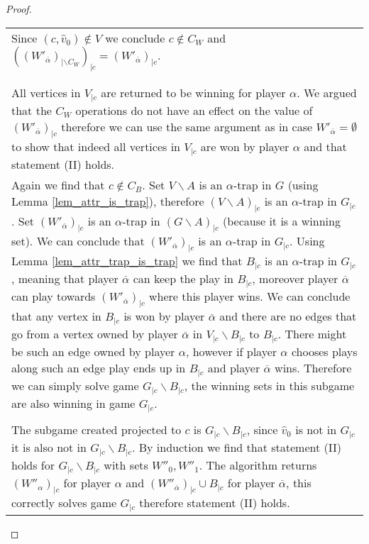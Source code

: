 \begin{theorem}
\begin{proof}
\begin{longtable}{|p{15.2cm}}
\begin{tabular}{|p{15cm}}
			\begin{tabular}{|p{14.8cm}}
				Case $W'_{\overline{\alpha}} \neq \emptyset$\\
				\hline
				Since $(c,\hat{v}_0) \notin V$ we conclude $c \notin C_W$ and $((W'_{\overline{\alpha}})_{|\backslash C_W})_{|c} = (W'_{\overline{\alpha}})_{|c}$.\\\\
				\begin{tabular}{|p{14.6cm}}
					Case $(W'_{\overline{\alpha}})_{|\backslash C} = \emptyset$\\
					\hline
					All vertices in $V_{|c}$ are returned to be winning for player $\alpha$. We argued that the $C_W$ operations do not have an effect on the value of $(W'_{\overline{\alpha}})_{|c}$ therefore we can use the same argument as in case $W'_{\overline{\alpha}} = \emptyset$ to show that indeed all vertices in $V_{|c}$ are won by player $\alpha$ and that statement (II) holds.
				\end{tabular}
				\begin{tabular}{|p{14.6cm}}
					Case $(W'_{\overline{\alpha}})_{|\backslash C} \neq \emptyset$\\
					\hline
					Again we find that $c \notin C_B$. Set $V \backslash A$ is an $\alpha$-trap in $G$ (using Lemma \ref{lem_attr_is_trap}), therefore $(V \backslash A)_{|c}$ is an $\alpha$-trap in $G_{|c}$. Set $(W'_{\overline{\alpha}})_{|c}$ is an $\alpha$-trap in $(G\backslash A)_{|c}$ (because it is a winning set). We can conclude that $(W'_{\overline{\alpha}})_{|c}$ is an $\alpha$-trap in $G_{|c}$. Using Lemma \ref{lem_attr_trap_is_trap} we find that $B_{|c}$ is an $\alpha$-trap in $G_{|c}$, meaning that player $\overline{\alpha}$ can keep the play in $B_{|c}$, moreover player $\overline{\alpha}$ can play towards $(W'_{\overline{\alpha}})_{|c}$ where this player wins. We can conclude that any vertex in $B_{|c}$ is won by player $\overline{\alpha}$ and there are no edges that go from a vertex owned by player $\overline{\alpha}$ in $V_{|c} \backslash B_{|c}$ to $B_{|c}$. There might be such an edge owned by player $\alpha$, however if player $\alpha$ chooses plays along such an edge play ends up in $B_{|c}$ and player $\overline{\alpha}$ wins. Therefore we can simply solve game $G_{|c} \backslash B_{|c}$, the winning sets in this subgame are also winning in game $G_{|c}$.\\\\			
					The subgame created projected to $c$ is $G_{|c} \backslash B_{|c}$, since $\hat{v}_0$ is not in $G_{|c}$ it is also not in $G_{|c} \backslash B_{|c}$. By induction we find that statement (II) holds for $G_{|c} \backslash B_{|c}$ with sets $W''_0,W''_1$. The algorithm returns $(W''_\alpha)_{|c}$ for player $\alpha$ and $(W''_{\overline{\alpha}})_{|c} \cup B_{|c}$ for player $\overline{\alpha}$, this correctly solves game $G_{|c}$ therefore statement (II) holds.

\end{tabular}
\end{tabular}
\end{tabular}
\end{longtable}
\end{proof}
\end{theorem}
